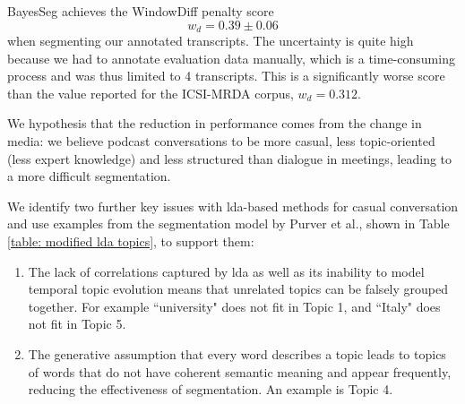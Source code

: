     BayesSeg achieves the WindowDiff penalty score
    \begin{equation}
     w_d = 0.39 \pm 0.06
    \end{equation}
    when segmenting our annotated transcripts. The uncertainty is quite high because we had to annotate evaluation data manually, which is a time-consuming process and was thus limited to 4 transcripts. This is a significantly worse score than the value reported for the ICSI-MRDA corpus, $w_d = 0.312$\cite{eisenstein2008bayesian}.

    We hypothesis that the reduction in performance comes from the change in media: we believe podcast conversations to be more casual, less topic-oriented (less expert knowledge) and less structured than dialogue in meetings, leading to a more difficult segmentation.


      We identify two further key issues with \gls{lda}-based methods for casual conversation and use examples from the segmentation \gls{model} by Purver et al., shown in Table \ref{table: modified lda topics}, to support them:
    \begin{enumerate}
        \item The lack of correlations captured by \gls{lda} as well as its inability to \gls{model} temporal topic evolution means that unrelated topics can be falsely grouped together. For example ``university" does not fit in Topic 1, and ``Italy" does not fit in Topic 5.
        \item The generative assumption that every word describes a topic leads to topics of words that do not have coherent semantic meaning and appear frequently, reducing the effectiveness of segmentation. An example is Topic 4.
    \end{enumerate}


